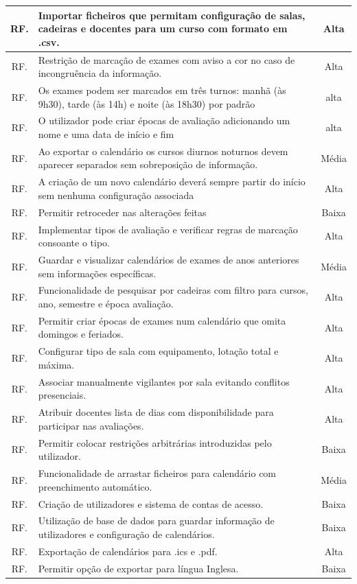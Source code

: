 \documentclass[11pt, twoside]{report}
\begin{document}
\begin{center}
\begin{tabularx}{\textwidth}{|c|X|c|}
				RF. & Importar ficheiros que permitam configuração de salas, cadeiras e docentes para um curso com formato em .csv. & Alta \\
				\hline
				RF. &  Restrição de marcação de exames com aviso a cor no caso de incongruência da informação. & Alta \\
				\hline
				RF. & Os exames podem ser marcados em três turnos: manhã (às 9h30), tarde (às 14h) e noite (às 18h30) por padrão & alta \\
				\hline
				RF. & O utilizador pode criar épocas de avaliação adicionando um nome e uma data de início e fim & alta \\
				\hline
				RF. & Ao exportar o calendário os cursos diurnos noturnos devem aparecer separados sem sobreposição de informação.& Média \\
				\hline
				RF. & A criação de um novo calendário deverá sempre partir do início sem nenhuma configuração associada & Alta\\
				\hline
				RF. & Permitir retroceder nas alterações feitas & Baixa \\
				\hline
				RF. & Implementar tipos de avaliação e verificar regras de marcação consoante o tipo. & Alta \\
				\hline
				RF. & Guardar e visualizar calendários de exames de anos anteriores sem informações específicas.  & Média \\
				\hline
				RF.  & Funcionalidade de pesquisar por cadeiras com filtro para cursos, ano, semestre e época avaliação.  & Alta \\
				\hline
				RF. & Permitir criar épocas de exames num calendário que omita domingos e feriados. & Alta \\
				\hline
				RF. & Configurar tipo de sala com equipamento, lotação total e máxima. & Alta \\
				\hline
				RF. & Associar manualmente vigilantes por sala evitando conflitos presenciais. & Alta \\
				\hline
				RF. & Atribuir docentes lista de dias com disponibilidade para participar nas avaliações. & Alta\\
				\hline
				\pagebreak
				RF. & Permitir colocar restrições arbitrárias introduzidas pelo utilizador. & Baixa \\
				\hline
				RF.  & Funcionalidade de arrastar ficheiros para calendário com preenchimento automático. & Média \\
				\hline
				RF. & Criação de utilizadores e sistema de contas de acesso. & Baixa \\
				\hline
				RF. & Utilização de base de dados para guardar informação de utilizadores e configuração de calendários. & Baixa \\
				\hline
				RF. & Exportação de calendários para .ics e .pdf. & Alta \\
				\hline
				RF. & Permitir opção de exportar para língua Inglesa. & Baixa \\
				\hline
			\end{tabularx}

	\end{center}
\end{document}

